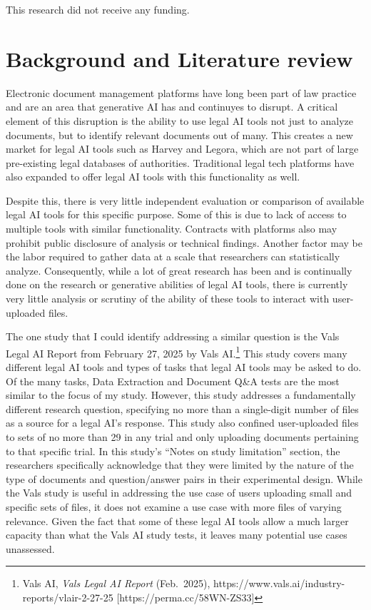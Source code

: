 \documentclass[
]{article}
\begin{document}
This research did not receive any funding.

\section{Background and Literature
review}\label{background-and-literature-review}

Electronic document management platforms have long been part of law
practice and are an area that generative AI has and continuyes to
disrupt. A critical element of this disruption is the ability to use
legal AI tools not just to analyze documents, but to identify relevant
documents out of many. This creates a new market for legal AI tools such
as Harvey and Legora, which are not part of large pre-existing legal
databases of authorities. Traditional legal tech platforms have also
expanded to offer legal AI tools with this functionality as well.

Despite this, there is very little independent evaluation or comparison
of available legal AI tools for this specific purpose. Some of this is
due to lack of access to multiple tools with similar functionality.
Contracts with platforms also may prohibit public disclosure of analysis
or technical findings. Another factor may be the labor required to
gather data at a scale that researchers can statistically analyze.
Consequently, while a lot of great research has been and is continually
done on the research or generative abilities of legal AI tools, there is
currently very little analysis or scrutiny of the ability of these tools
to interact with user-uploaded files.

The one study that I could identify addressing a similar question is the
Vals Legal AI Report from February 27, 2025 by Vals AI.\footnote{Vals
  AI, \emph{Vals Legal AI Report} (Feb.~2025),
  https://www.vals.ai/industry-reports/vlair-2-27-25
  {[}https://perma.cc/58WN-ZS33{]}} This study covers many different
legal AI tools and types of tasks that legal AI tools may be asked to
do. Of the many tasks, Data Extraction and Document Q\&A tests are the
most similar to the focus of my study. However, this study addresses a
fundamentally different research question, specifying no more than a
single-digit number of files as a source for a legal AI's response. This
study also confined user-uploaded files to sets of no more than 29 in
any trial and only uploading documents pertaining to that specific
trial. In this study's ``Notes on study limitation'' section, the
researchers specifically acknowledge that they were limited by the
nature of the type of documents and question/answer pairs in their
experimental design. While the Vals study is useful in addressing the
use case of users uploading small and specific sets of files, it does
not examine a use case with more files of varying relevance. Given the
fact that some of these legal AI tools allow a much larger capacity than
what the Vals AI study tests, it leaves many potential use cases
unassessed.
\end{document}
